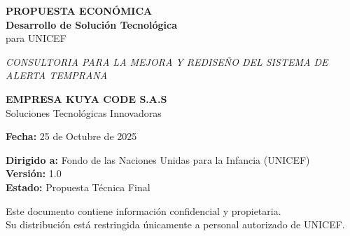 \begin{titlepage}
    \centering
    
    
    \vspace{2cm}
    
    {\Huge\bfseries PROPUESTA ECONÓMICA\\[0.5cm]}
    {\Large\bfseries Desarrollo de Solución Tecnológica\\[0.3cm]}
    {\Large para UNICEF\\[2cm]}
    
    {\large\textit{CONSULTORIA PARA LA MEJORA Y REDISEÑO DEL SISTEMA DE ALERTA TEMPRANA\\[3cm]}}
    
    {\Large\bfseries EMPRESA KUYA CODE S.A.S\\[0.5cm]}
    {\large Soluciones Tecnológicas Innovadoras\\[2cm]}
    
    {\large\textbf{Fecha:} 25 de Octubre de 2025\\[1cm]}
    
    {\normalsize
    \textbf{Dirigido a:} Fondo de las Naciones Unidas para la Infancia (UNICEF)\\[0.3cm]
    \textbf{Versión:} 1.0\\[0.3cm]
    \textbf{Estado:} Propuesta Técnica Final\\
    }
    
    \vfill
    
    {\footnotesize
    Este documento contiene información confidencial y propietaria.\\
    Su distribución está restringida únicamente a personal autorizado de UNICEF.
    }
    
\end{titlepage}

\newpage
\thispagestyle{empty}
\mbox{}
\newpage